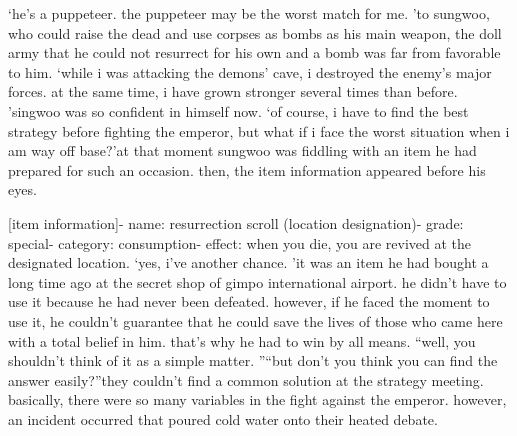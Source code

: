‘he’s a puppeteer.
 the puppeteer may be the worst match for me.
’to sungwoo, who could raise the dead and use corpses as bombs as his main weapon, the doll army that he could not resurrect for his own and a bomb was far from favorable to him.
‘while i was attacking the demons’ cave, i destroyed the enemy’s major forces.
 at the same time, i have grown stronger several times than before.
’singwoo was so confident in himself now.
‘of course, i have to find the best strategy before fighting the emperor, but what if i face the worst situation when i am way off base?’at that moment sungwoo was fiddling with an item he had prepared for such an occasion.
then, the item information appeared before his eyes.


[item information]- name: resurrection scroll (location designation)- grade: special- category: consumption- effect: when you die, you are revived at the designated location.
‘yes, i’ve another chance.
’it was an item he had bought a long time ago at the secret shop of gimpo international airport.
 he didn’t have to use it because he had never been defeated.
however, if he faced the moment to use it, he couldn’t guarantee that he could save the lives of those who came here with a total belief in him.
 that’s why he had to win by all means.
“well, you shouldn’t think of it as a simple matter.
”“but don’t you think you can find the answer easily?”they couldn’t find a common solution at the strategy meeting.
 basically, there were so many variables in the fight against the emperor.
however, an incident occurred that poured cold water onto their heated debate.


 
